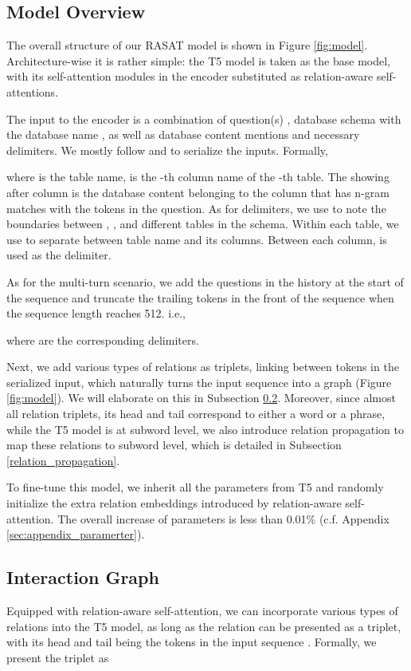 \documentclass[11pt]{article}
\begin{document}
\subsection{Model Overview}
The overall structure of our RASAT model is shown in Figure \ref{fig:model}. Architecture-wise it is rather simple: the T5 model is taken as the base model, with its self-attention modules in the encoder substituted as relation-aware self-attentions. 

The input to the encoder is a combination of question(s) , database schema  with the database name , as well as database content mentions and necessary delimiters. We mostly follow  \citet{shaw-etal-2021-compositional} and  \citet{scholak-etal-2021-picard} to serialize the inputs. Formally, 


where  is the table name,  is the -th column name of the -th table. The  showing after column  is the database content belonging to the column that has n-gram matches with the tokens in the question. As for delimiters, we use  to note the boundaries between , , and different tables in the schema. Within each table, we use  to separate between table name and its columns. Between each column,  is used as the delimiter. 

As for the multi-turn scenario, we add the questions in the history at the start of the sequence and truncate the trailing tokens in the front of the sequence when the sequence length reaches 512. i.e.,


where  are the corresponding delimiters. 

Next, we add various types of relations as triplets, linking between tokens in the serialized input, which naturally turns the input sequence into a graph (Figure \ref{fig:model}). We will elaborate on this in Subsection \ref{interaction_graph}. Moreover, since almost all relation triplets, its head and tail correspond to either a word or a phrase, while the T5 model is at subword level, we also introduce relation propagation to map these relations to subword level, which is detailed in Subsection \ref{relation_propagation}.

To fine-tune this model, we inherit all the parameters from T5 and randomly initialize the extra relation embeddings introduced by relation-aware self-attention. 
The overall increase of parameters is less than 0.01\% (c.f. Appendix \ref{sec:appendix_paramerter}).

\subsection{Interaction Graph} \label{interaction_graph}
Equipped with relation-aware self-attention, we can incorporate various types of relations into the T5 model, as long as the relation can be presented as a triplet, with its head and tail being the tokens in the input sequence . Formally, we present the triplet as 
\end{document}
